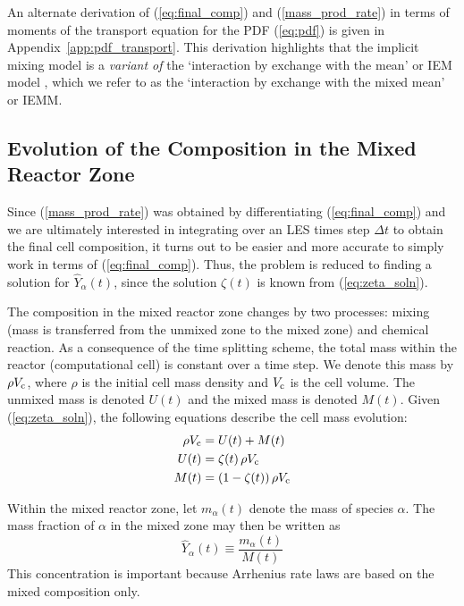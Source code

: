 An alternate derivation of (\ref{eq:final_comp}) and (\ref{mass_prod_rate}) in terms of moments of the transport equation for the PDF (\ref{eq:pdf}) is given in Appendix~\ref{app:pdf_transport}.  This derivation highlights that the implicit mixing model is a \emph{variant of} the `interaction by exchange with the mean' or IEM model \cite{Dopazo:1974}, which we refer to as the `interaction by exchange with the mixed mean' or IEMM.

\subsection{Evolution of the Composition in the Mixed Reactor Zone}

Since (\ref{mass_prod_rate}) was obtained by differentiating (\ref{eq:final_comp}) and we are ultimately interested in integrating over an LES times step $\Delta t$ to obtain the final cell composition, it turns out to be easier and more accurate to simply work in terms of (\ref{eq:final_comp}). Thus, the problem is reduced to finding a solution for $\hat{Y}_{\alpha}(t)$, since the solution $\zeta(t)$ is known from (\ref{eq:zeta_soln}).

The composition in the mixed reactor zone changes by two processes: mixing (mass is transferred from the unmixed zone to the mixed zone) and chemical reaction. As a consequence of the time splitting scheme, the total mass within the reactor (computational cell) is constant over a time step.  We denote this mass by $\rho V_{\rm c}$, where $\rho$ is the initial cell mass density and $V_{\rm c}$ is the cell volume.  The unmixed mass is denoted $U(t)$ and the mixed mass is denoted $M(t)$.  Given (\ref{eq:zeta_soln}), the following equations describe the cell mass evolution:
\begin{align}
\label{eq:mixunmix_1} \rho V_{\rm c} &= U(t) + M(t) \\
\label{eq:mixunmix_2} U(t) &= \zeta(t)\,\rho V_{\rm c} \\
\label{eq:mixunmix_3} M(t) &= (1-\zeta(t))\,\rho V_{\rm c}
\end{align}

Within the mixed reactor zone, let $m_\alpha(t)$ denote the mass of species $\alpha$.  The mass fraction of $\alpha$ in the mixed zone may then be written as
\begin{equation}
\label{eq:mass_fraction_mixed}
\hat{Y}_{\alpha}(t)\equiv\frac{m_{\alpha}(t)}{M(t)}
\end{equation}
This concentration is important because Arrhenius rate laws are based on the mixed composition only.


